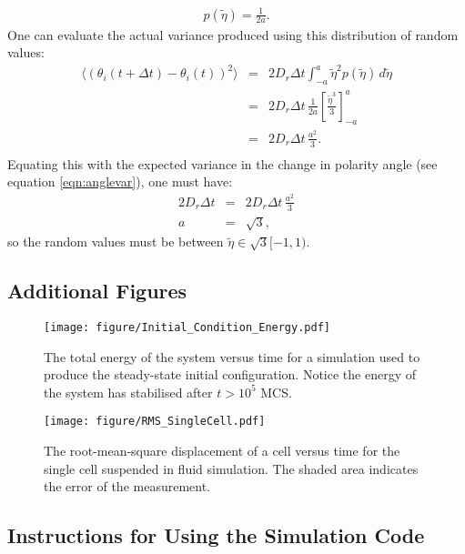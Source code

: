 \documentclass[a4paper,12pt]{article}
\newcommand{\inc}{\Delta}
\begin{document}
\begin{eqnarray}
p(\tilde\eta) = \frac{1}{2a}.
\end{eqnarray}
One can evaluate the actual variance produced using this distribution of random values:
\begin{eqnarray}
\langle\left(\theta_i(t+\inc t) - \theta_i(t)\right)^2\rangle & = & 2D_r\inc t \int_{-a}^{a} \tilde\eta^2 p(\tilde\eta)\, d\tilde\eta\\
& = & 2D_r\inc t\,\frac{1}{2a}\left[\frac{\tilde\eta^3}{3}\right]_{-a}^{a}\\
& = & 2D_r\inc t\,\frac{a^2}{3}.\\
\end{eqnarray}
Equating this with the expected variance in the change in polarity angle (see equation \ref{eqn:anglevar}), one must have:
\begin{eqnarray}
2D_r \inc t & = & 2D_r\inc t\,\frac{a^2}{3}\\
a & = & \sqrt{3},
\end{eqnarray}
so the random values must be between $\tilde\eta \in \sqrt{3}[-1,1)$.

\subsection{Additional Figures}
\label{app:addfig}
\begin{figure}[h]
\centering
\texttt{[image: figure/Initial\_Condition\_Energy.pdf]}
\caption{The total energy of the system versus time for a simulation used to produce the steady-state initial configuration. Notice the energy of the system has stabilised after $t > 10^5$ MCS.}
\label{fig:energyinitcondition}
\end{figure}
\begin{figure}[h]
\centering
\texttt{[image: figure/RMS\_SingleCell.pdf]}
\caption{The root-mean-square displacement of a cell versus time for the single cell suspended in fluid simulation. The shaded area indicates the error of the measurement.}
\label{fig:rmssinglecell}
\end{figure}
\FloatBarrier
\subsection{Instructions for Using the Simulation Code}
\end{document}
